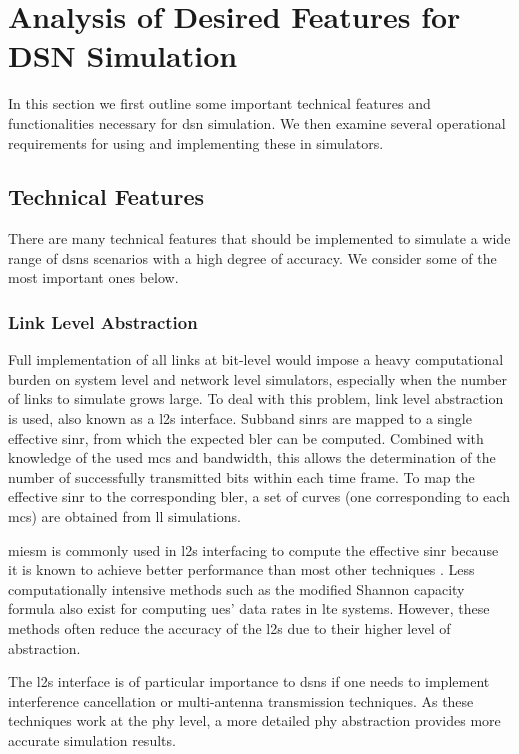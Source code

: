 \documentclass[conference]{IEEEtran}
\begin{document}
\section{Analysis of Desired Features for DSN Simulation}\label{sec:supported_features}

In this section we first outline some important technical features and functionalities necessary for \acl{dsn} simulation. We then examine several operational requirements for using and implementing these in simulators.

\subsection{Technical Features}\label{subsect:technical_features}
There are many technical features that should be implemented to simulate a wide range of \acp{dsn} scenarios with a high degree of accuracy. We consider some of the most important ones below.

\subsubsection{Link Level Abstraction}\label{subsect:Link_level_abstraction}
Full implementation of all links at bit-level would impose a heavy computational burden on system level and network level simulators, especially when the number of links to simulate grows large. To deal with this problem, link level abstraction is used, also known as a \ac{l2s} interface. Subband \acp{sinr} are mapped to a single effective \ac{sinr}, from which the expected \ac{bler} can be computed. Combined with knowledge of the used \ac{mcs} and bandwidth, this allows the determination of the number of successfully transmitted bits within each time frame.
To map the effective \ac{sinr} to the corresponding \ac{bler}, a set of curves (one corresponding to each \ac{mcs}) are obtained from \ac{ll} simulations.

\ac{miesm} is commonly used in \ac{l2s}
interfacing to compute the effective \ac{sinr} because it is known to achieve better performance than most other techniques \cite{Brueninghaus2005}.
Less computationally intensive methods such as the modified Shannon capacity formula \cite{Mogensen2007} also exist for computing \acp{ue}' data rates in \ac{lte} systems. However, these methods often reduce the accuracy  of the \ac{l2s} due to their higher level of abstraction.

The \ac{l2s} interface is of particular importance to \acp{dsn} if one needs to implement interference cancellation or multi-antenna
transmission techniques. As these techniques work at the \ac{phy} level, a more detailed \ac{phy} abstraction provides more accurate simulation results.
\end{document}
